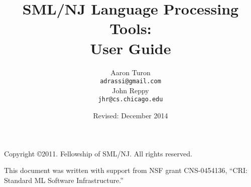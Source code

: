\documentclass[11pt,letterpaper]{book}
\title{
  SML/NJ Language Processing Tools:\\
  User Guide}
\author{
  Aaron Turon\\
  \texttt{adrassi@gmail.com}\\[0.5em]
  John Reppy\\
  \texttt{jhr@cs.chicago.edu}}
\date{Revised: December 2014}
\begin{document}
\frontmatter

	\maketitle
	
	\phantom{.}
	
	\noindent Copyright \copyright{}2011.  Fellowship of SML/NJ.  All rights reserved.
	
	\vskip 12pt
	\noindent This document was written with support from NSF grant CNS-0454136, ``CRI: Standard ML Software Infrastructure.''
	
	\pagebreak
	
	\tableofcontents

\mainmatter


	\newpage

	
	

	
		
		
		
		
		
	
%	
%		
%		


%		
%		


%	
%	
\end{document}
